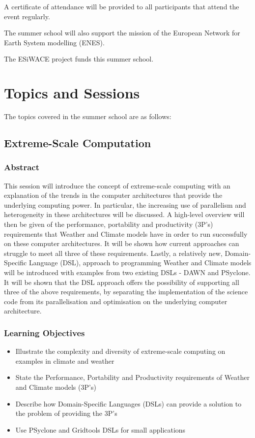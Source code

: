 A certificate of attendance will be provided to all participants that attend the event regularly.

The summer school will also support the mission of the European Network for Earth System modelling (ENES).

The ESiWACE project funds this summer school.

\section{Topics and Sessions}

The topics covered in the summer school are as follows:

\subsection{Extreme-Scale Computation}

\subsubsection{Abstract}

This session will introduce the concept of extreme-scale computing with an explanation of the trends in the computer architectures that provide the underlying computing power. In particular, the increasing use of parallelism and heterogeneity in these architectures will be discussed.
A high-level overview will then be given of the performance, portability and productivity (3P's) requirements that Weather and Climate models have in order to run successfully on these computer architectures. It will be shown how current approaches can struggle to meet all three of these requirements.
Lastly, a relatively new, Domain-Specific Language (DSL), approach to programming Weather and Climate models will be introduced with examples from two existing DSLs - DAWN and PSyclone. It will be shown that the DSL approach offers the possibility of supporting all three of the above requirements, by separating the implementation of the science code from its parallelisation and optimisation on the underlying computer architecture.

\subsubsection{Learning Objectives}

\begin{itemize}

\item Illustrate the complexity and diversity of extreme-scale computing on examples in climate and weather
\item State the Performance, Portability and Productivity requirements of Weather and Climate models (3P’s)
\item Describe how Domain-Specific Languages (DSLs) can provide a solution to the problem of providing the 3P's
\item Use PSyclone and Gridtools DSLs for small applications

\end{itemize}

